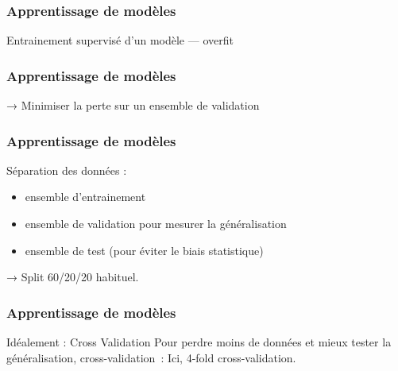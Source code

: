 \begin{frame}
  \frametitle{Apprentissage de modèles}
  Entrainement supervisé d'un modèle — overfit
\end{frame}

\begin{frame}
  \frametitle{Apprentissage de modèles}
  → Minimiser la perte sur un ensemble de validation
\end{frame}

\begin{frame}
  \frametitle{Apprentissage de modèles}
  Séparation des données :
  \begin{itemize}
  \item ensemble d'entrainement
  \item ensemble de validation pour mesurer la généralisation
  \item ensemble de test (pour éviter le biais statistique)
  \end{itemize}
  → Split 60/20/20 habituel.
\end{frame}

\begin{frame}
  \frametitle{Apprentissage de modèles}
  Idéalement : Cross Validation
  Pour \og perdre\fg{} moins de données et mieux tester la
  généralisation, cross-validation :
  Ici, 4-fold cross-validation.
\end{frame}

